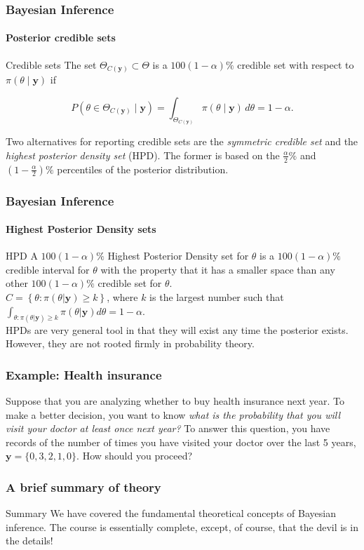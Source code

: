 \documentclass[12pt, compress]{beamer}
\begin{document}
\begin{frame}
	\frametitle{Bayesian Inference}
	\framesubtitle{Posterior credible sets}
	\begin{block}{Credible sets}
The set $\Theta_{C(\mathbf{y})} \subset \Theta$ is a $100(1 - \alpha)\%$ credible set with respect to $\pi(\theta \mid \mathbf{y})$ if

\[
P(\theta \in \Theta_{C(\mathbf{y})} \mid \mathbf{y}) = \int_{\Theta_{C(\mathbf{y})}} \pi(\theta \mid \mathbf{y}) \, d\theta = 1 - \alpha.
\]

Two alternatives for reporting credible sets are the \textit{symmetric credible set} and the \textit{highest posterior density set} (HPD). The former is based on the $\frac{\alpha}{2}\%$ and $(1 - \frac{\alpha}{2})\%$ percentiles of the posterior distribution.
	\end{block}
	
\end{frame}
\begin{frame}
	\frametitle{Bayesian Inference}
	\framesubtitle{Highest Posterior Density sets}
	\begin{block}{HPD}
		A $100(1-\alpha)\%$ Highest Posterior Density set for $\theta$ is a $100(1-\alpha)\%$ credible interval for $\theta$ with the property that it has a smaller space than any other $100(1-\alpha)\%$ credible set for $\theta$.\\
		$C=\left\{\theta:\pi(\theta|\boldsymbol{y})\geq k \right\}$, where $k$ is the largest number such that $\int_{\theta:\pi(\theta|\boldsymbol{y})\geq k}\pi(\theta|\boldsymbol{y})d\theta=1-\alpha$.\\
		HPDs are very general tool in that they will exist any time the posterior exists. However, they are not rooted firmly in probability theory. 
		
	\end{block}
\end{frame}

\begin{frame}
	\frametitle{Example: Health insurance}
	
Suppose that you are analyzing whether to buy health insurance next year. To make a better decision, you want to know \textit{what is the probability that you will visit your doctor at least once next year?} To answer this question, you have records of the number of times you have visited your doctor over the last 5 years, \( \mathbf{y} = \{0, 3, 2, 1, 0\} \). How should you proceed?
\end{frame}

\begin{frame}
	\frametitle{A brief summary of theory}
	
	\begin{block}{Summary}
		We have covered the fundamental theoretical concepts of Bayesian inference. The course is essentially complete, except, of course, that the devil is in the details!
	\end{block}	
\end{frame}


%		
			
\end{document}
